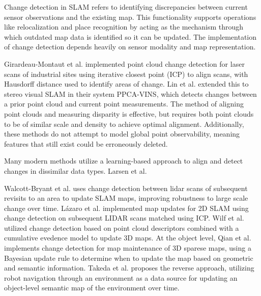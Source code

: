 Change detection in SLAM refers to identifying discrepancies between current sensor observations and the existing map. This functionality supports operations like relocalization and place recognition by acting as the mechanism through which outdated map data is identified so it can be updated. The implementation of change detection depends heavily on sensor modality and map representation.

Girardeau-Montaut et al. \cite{girardeau-montautCHANGEDETECTIONPOINTS2005} implemented point cloud change detection for laser scans of industrial sites using iterative closest point (ICP) \cite{arunLeastSquaresFittingTwo1987,beslMethodRegistration3D1992} to align scans, with Hausdorff distance \cite{aspertMESHMeasuringErrors2002} used to identify areas of change. Lin et al. \cite{linPointCloudChange2022} extended this to stereo visual SLAM in their system PPCA-VINS, which detects changes between a prior point cloud and current point measurements. The method of aligning point clouds and measuring disparity is effective, but requires both point clouds to be of similar scale and density to achieve optimal alignment. Additionally, these methods do not attempt to model global point observability, meaning features that still exist could be erroneously deleted.

Many modern methods utilize a learning-based approach to align and detect changes in dissimilar data types. Larsen et al. \cite{larsenChangeDetectionModel} %

Walcott-Bryant et al. \cite{walcott-bryantDynamicPoseGraph2012} uses change detection between lidar scans of subsequent revisits to an area to update SLAM maps, improving robustness to large scale change over time. Lázaro et al. \cite{lazaroEfficientLongtermMapping2018} implemented map updates for 2D SLAM using change detection on subsequent LIDAR scans matched using ICP. Wilf et al. \cite{wilfCumulativeEvidenceScene2022} utilized change detection based on point cloud descriptors combined with a cumulative evedence model to update 3D maps. At the object level, Qian et al. \cite{qianPOCDProbabilisticObjectLevel2022} implements change detection for map maintenance of 3D sparese maps, using a Bayesian update rule to determine when to update the map based on geometric and semantic information. Takeda et al. \cite{takedaLifelongChangeDetection2023} proposes the reverse approach, utilizing robot navigation through an environment as a data source for updating an object-level semantic map of the environment over time.


